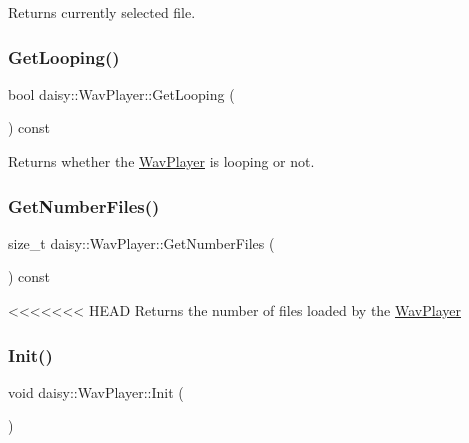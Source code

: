 Returns currently selected file. \mbox{\label{classdaisy_1_1_wav_player_ab4a32e794f0cdc07adab9204fc5c8a80}} 
\subsubsection{\texorpdfstring{Get\+Looping()}{GetLooping()}}
{\footnotesize\ttfamily bool daisy\+::\+Wav\+Player\+::\+Get\+Looping (\begin{DoxyParamCaption}{ }\end{DoxyParamCaption}) const\hspace{0.3cm}{\ttfamily [inline]}}

Returns whether the \hyperlink{classdaisy_1_1_wav_player}{Wav\+Player} is looping or not. \mbox{\label{classdaisy_1_1_wav_player_affa30de9a51750132f935a2421f17d75}} 
\subsubsection{\texorpdfstring{Get\+Number\+Files()}{GetNumberFiles()}}
{\footnotesize\ttfamily size\+\_\+t daisy\+::\+Wav\+Player\+::\+Get\+Number\+Files (\begin{DoxyParamCaption}{ }\end{DoxyParamCaption}) const\hspace{0.3cm}{\ttfamily [inline]}}

<<<<<<< HEAD
Returns the number of files loaded by the \hyperlink{classdaisy_1_1_wav_player}{Wav\+Player} \mbox{\label{classdaisy_1_1_wav_player_a37026485a3d2aebfd05460771d056605}} 
\subsubsection{\texorpdfstring{Init()}{Init()}}
{\footnotesize\ttfamily void daisy\+::\+Wav\+Player\+::\+Init (\begin{DoxyParamCaption}{ }\end{DoxyParamCaption})}

